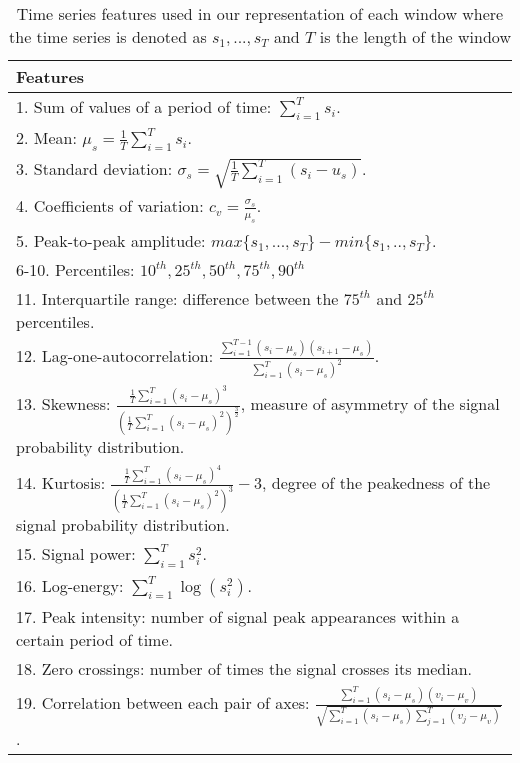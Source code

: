 \documentclass[letterpaper]{article}
\begin{document}
\begin{table}[h]
\centering
\begin{tabular}{|p{8cm}|}  \hline
Features \\ \hline
1. Sum of values of a period of time: $\sum^T_{i=1} s_i$.\\ 
2. Mean: $\mu_s = \frac{1}{T} \sum^T_{i=1} s_i$.\\ 
3. Standard deviation: $\sigma_s = \sqrt{\frac{1}{T} \sum^T_{i=1} (s_i - u_s)}$.\\ 
4. Coefficients of variation: $c_v = \frac{\sigma_s}{\mu_s}$. \\  
5. Peak-to-peak amplitude: $max \{s_1, ..., s_T\} - min \{s_1, .., s_T\}$.\\ 
6-10. Percentiles: $10^{th}, 25^{th}, 50^{th}, 75^{th}, 90^{th}$\\
11. Interquartile range: difference between the $75^{th}$ and $25^{th}$ percentiles.\\  
12. Lag-one-autocorrelation: $\frac{\sum^{T-1}_{i=1} (s_i - \mu_s)(s_{i+1} - \mu_s)}{\sum^T_{i=1} (s_i - \mu_s)^2}$.\\
13. Skewness: 
 $\frac{\frac{1}{T} \sum^T_{i=1} (s_i - \mu_s)^3}
{(\frac{1}{T} \sum^T_{i=1} (s_i - \mu_s)^2)^\frac{3}{2}}$, 
 measure of asymmetry of the signal probability distribution.\\  
14. Kurtosis: 
 $\frac{\frac{1}{T} \sum^T_{i=1} (s_i - \mu_s)^4}
{(\frac{1}{T} \sum^T_{i=1} (s_i - \mu_s)^2)^3} - 3$, 
 degree of the peakedness of the signal probability distribution.\\ 
15. Signal power: $\sum^T_{i=1} s_i^2$.\\  
16. Log-energy: $\sum^T_{i=1} \log(s_i^2)$.\\  
17. Peak intensity: number of signal peak appearances within a certain period of time.\\ 
18. Zero crossings: number of times the signal crosses its median.\\  
19. Correlation between each pair of axes: 
 $\frac{\sum^T_{i=1}(s_i-\mu_s)(v_i-\mu_v)}
{\sqrt{\sum^T_{i=1}(s_i-\mu_s) \sum^T_{j=1}(v_j-\mu_v)}}$.\\ \hline 
\end{tabular}

\caption{Time series features used in our representation of each window where the time series is denoted as $s_1, ..., s_T$ and $T$ is the length of the window}
\label{tbl:features}
\end{table}
\end{document}

